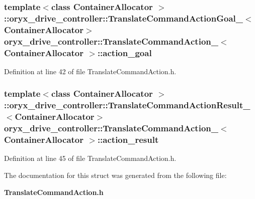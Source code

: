 \subsubsection[{action\-\_\-goal}]{\setlength{\rightskip}{0pt plus 5cm}template$<$class Container\-Allocator $>$ \-::{\bf oryx\-\_\-drive\-\_\-controller\-::\-Translate\-Command\-Action\-Goal\-\_\-}$<$\-Container\-Allocator$>$ {\bf oryx\-\_\-drive\-\_\-controller\-::\-Translate\-Command\-Action\-\_\-}$<$ \-Container\-Allocator $>$\-::{\bf action\-\_\-goal}}\label{structoryx__drive__controller_1_1TranslateCommandAction___ac2c5e3aa150909dbd6d27ed467881467}


\-Definition at line 42 of file \-Translate\-Command\-Action.\-h.

\subsubsection[{action\-\_\-result}]{\setlength{\rightskip}{0pt plus 5cm}template$<$class Container\-Allocator $>$ \-::{\bf oryx\-\_\-drive\-\_\-controller\-::\-Translate\-Command\-Action\-Result\-\_\-}$<$\-Container\-Allocator$>$ {\bf oryx\-\_\-drive\-\_\-controller\-::\-Translate\-Command\-Action\-\_\-}$<$ \-Container\-Allocator $>$\-::{\bf action\-\_\-result}}\label{structoryx__drive__controller_1_1TranslateCommandAction___abda7f3a59e16366d5475c64ae95c9d36}


\-Definition at line 45 of file \-Translate\-Command\-Action.\-h.



\-The documentation for this struct was generated from the following file\-:\begin{DoxyCompactItemize}
\item 
{\bf \-Translate\-Command\-Action.\-h}\end{DoxyCompactItemize}
